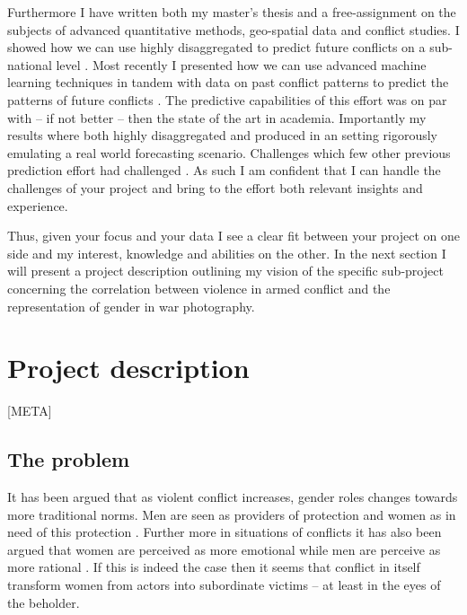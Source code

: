 \documentclass[a4paper]{article}
\begin{document}
Furthermore I have written both my master's thesis \citep{SPECIALE} and a free-assignment \citep{Maase}  on the subjects of advanced quantitative methods, geo-spatial data and conflict studies. I showed how we can use highly disaggregated to predict future conflicts on a sub-national level \cite{Maase,SPECIALE}. Most recently I presented how we can use advanced machine learning techniques in tandem with data on past conflict patterns to predict the patterns of future conflicts \cite{SPECIALE}. The predictive capabilities of this effort was on par with -- if not better -- then the state of the art in academia. Importantly my results where both highly disaggregated and produced in an setting rigorously emulating a real world forecasting scenario. Challenges which few other previous prediction effort had challenged \citep[48-50]{SPECIALE}. As such I am confident that I can handle the challenges of your project and bring to the effort both relevant insights and experience.\par

Thus, given your focus and your data I see a clear fit between your project on one side and my interest, knowledge and abilities on the other. In the next section I will present a project description outlining my vision of the specific sub-project concerning the correlation between violence in armed conflict and the representation of gender in war photography.\par

\section{Project description} 

[META]

\subsection{The problem}


It has been argued that as violent conflict increases, gender roles changes towards more traditional norms. Men are seen as providers of protection and women as in need of this protection \citep{elshtain1995women, carpenter2003women}. Further more in situations of conflicts it has also been argued that women are perceived as more emotional while men are perceive as more rational \citep{elshtain1993public}. If this is indeed the case then it seems that conflict in itself transform women from actors into subordinate victims -- at least in the eyes of the beholder.\par 
\end{document}
